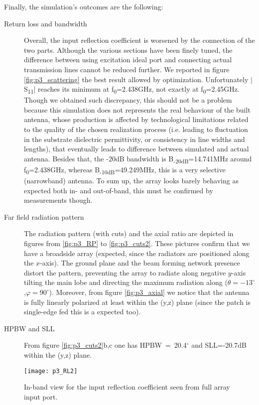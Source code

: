 Finally, the simulation's outcomes are the following:
\begin{description}
	\item[Return loss and bandwidth] Overall, the input reflection coefficient is worsened by the connection of the two parts. Although the various sections have been finely tuned, the difference between using excitation ideal port and connecting actual transmission lines cannot be reduced further. We reported in figure \ref{fig:p3_scattering} the best result allowed by optimization. Unfortunately $|$S\textsubscript{11}$|$ reaches its minimum at f\textsubscript{0}\textquotesingle=2.438GHz, not exactly at f\textsubscript{0}=2.45GHz. Though we obtained such discrepancy, this should not be a problem because this simulation does not represents the real behaviour of the built antenna, whose production is affected by technological limitations related to the quality of the chosen realization process (i.e. leading to fluctuation in the substrate dielectric permittivity, or consistency in line widths and lengths), that eventually leads to difference between simulated and actual antenna.  
	Besides that, the -20dB bandwidth is B\textsubscript{-20dB}=14.741MHz around f\textsubscript{0}\textquotesingle=2.438GHz, whereas  B\textsubscript{-10dB}=49.249MHz, this is a very selective (narrowband) antenna. To sum up, the array looks barely behaving as expected both in- and out-of-band, this must be confirmed by measurements though.
	
	\item[Far field radiation pattern] The radiation pattern (with cuts) and the axial ratio are depicted in figures from \ref{fig:p3_RP} to \ref{fig:p3_cuts2}. These pictures confirm that we have a broadside array (expected, since the radiators are positioned along the $x$-axis). The ground plane and the beam forming network presence distort the pattern, preventing the array to radiate along negative $y$-axis tilting the main lobe and directing the maximum radiation along ($\theta=-13^\circ$,$\varphi=90^\circ$).
	Moreover, from figure \ref{fig:p3_axial} we notice that the antenna is fully linearly polarized at least within the (y,z) plane (since the patch is single-edge fed this is a expected too). 
	
	\item [HPBW and SLL] From figure \ref{fig:p3_cuts2}b,c one has HPBW~=~20.4$^\circ$ and SLL=-20.7dB within the (y,z) plane.
\end{description}

\begin{figure}[t] 
	\centering
	\texttt{[image: p3\_RL2]}
	\caption{In-band view for the input reflection coefficient seen from full array input port.}
	\label{fig:p3_scattering_band}
\end{figure}

